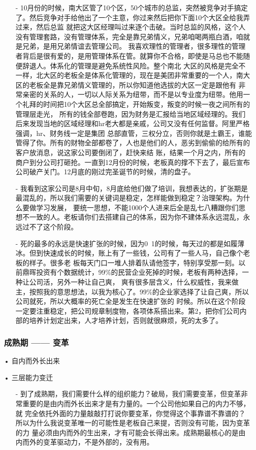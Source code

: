 \documentclass[12pt]{article}
\begin{document}
\begin{itemize}
    \item[-] 10月份的时候，南大区管了10个区，50个城市的总监，突然被竞争对手搞定了。然后竞争对手给他出了一个主意，你过来然后把你下面10个大区全给我弄过来，然后总监 就把这大区经理叫过来逐个击破。当时总监的风格，这个人没有管理套路，没有管理体系，完全是靠兄弟情义，兄弟咱喝两瓶白酒，咱就是兄弟，是用兄弟情谊去管理公司。 我喜欢理性的管理者，很多理性的管理者背后是很有爱的，是用管理体系在管。就算你不合格，即使是马总也不能随便辞退人。体系化的管理是避免系统性风险。整个南北 大区的风格是完全不一样，北大区的老板全是体系化管理的，现在是美团非常重要的一个人，南大区的老板全是靠兄弟情义管理的，所以你知道他选拔的大区一定是跟他有 非常亲密的关系的人，一切以人际关系为纽带，而不是以专业度为纽带。他用一个礼拜的时间把10个大区总全部搞定，开始叛变，叛变的时候一夜之间所有的管理层走光， 所有的钱全部卷跑，因为财务是汇报给当地区域经理的。我们后来发现当地的区域经理和hr老大都是亲戚，公司又没有任何监督。阿里严格强调，hr、财务线一定是集团 总部直管，三权分立，否则你就是土霸王，谁能管得了你。所有的财物全部都卷了，人也是他们的人，恶劣到偷偷的给所有的客户放消息，说这家公司要倒闭了，赶快来结 账，结果一个月之内，所有的商户到分公司打砸抢。一直到12月份的时候，老板真的撑不下去了，最后宣布公司破产关门。12月底的刚过完圣诞节的时候，清的盘子。
    \item[-] 我看到这家公司是8月中旬，8月底给他们做了培训，我想表达的，扩张期是最混乱的，所以我们需要的关键词是稳定，怎样能做到稳定？治理架构。为什么要做学习发展， 要统一思想，不能1000个人进来后全是乱七八糟跟你们思想不一致的人。老板请你们去搭建自己的体系，因为你不建体系永远混乱，永远过不了这个阶段。
    \item[-] 死的最多的永远是快速扩张的时候，因为0~1的时候，每天过的都是如履薄冰。但到快速成长的时候，账上有了一些钱，公司有了一些人马，自己像个老板的样子。很多老 板每天门口一堆人排着队请他签字，特别享受那一刻。以前鼎晖投资有个数据统计，99\%的民营企业死掉的时候，老板有两种选择，一种让公司活，另外一种让自己爽， 爽有很多层含义，什么权威性，我来做主，按照我的意思想法，以我为核心了。99\%的企业家选择了让自己爽，所以公司就死，所以大概率的死亡全是发生在快速扩张的 时候。所以在这个阶段一定要注重稳定，把公司规章制度物，各项体系搭出来。第2，把你们公司内部的培养计划定出来，人才培养计划，否则就很麻烦，死的太多了。
\end{itemize}

\subsubsection{成熟期 —— 变革}
• 自内而外长出来

• 三层能力变迁
\begin{itemize}
\setlength{\itemsep}{0pt}
\setlength{\parsep}{0pt}
\setlength{\parskip}{0pt}
    \item[-] 到了成熟期，我们需要什么样的组织能力？破局，我们需要变革，但变革非常重要的是由内而外长出来才是有力量的。一个公司他如果自己的内力不够，就 完全依托外面的力量敲敲打打说你要变革，你觉得这个事靠谱不靠谱的？所以为什么我说变革唯一的可能性是老板自己来提，否则没有可能，因为变革的力 量必须由内而外的生出来，才有可能会长得出来。成熟期最核心的是由内而外的变革驱动力，不是外部的，没有用。
\end{itemize}
\end{document}
